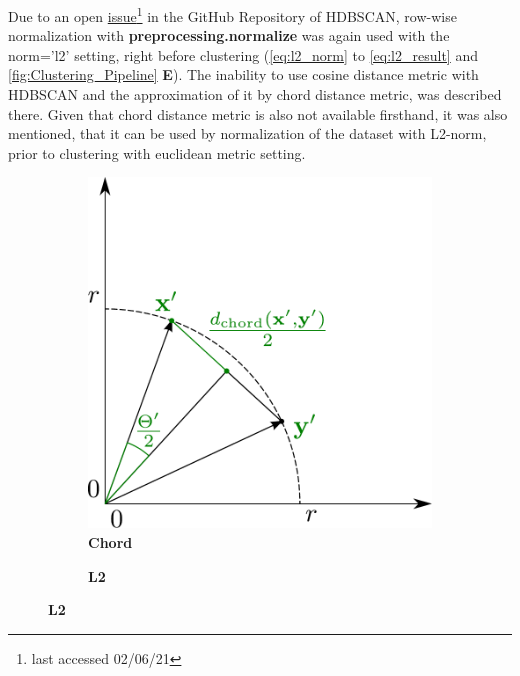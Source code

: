 Due to an open \href{https://github.com/scikit-learn-contrib/hdbscan/issues/69}{issue}\footnote{last accessed 02/06/21} in the GitHub Repository of \gls{HDBSCAN}, row-wise normalization with \textbf{preprocessing.normalize} was again used with the \colorbox{backcolour}{norm='l2'} setting, right before clustering (\autoref{eq:l2_norm} to \autoref{eq:l2_result} and \autoref{fig:Clustering_Pipeline} \textsf{\textbf{E}}). The inability to use cosine distance metric with \gls{HDBSCAN} and the approximation of it by chord distance metric, was described there. Given that chord distance metric is also not available firsthand, it was also mentioned, that it can be used by normalization of the dataset with L2-norm, prior to clustering with euclidean metric setting.

\begin{figure}[!hbt]
    \centering
    \begin{subfigure}[b]{0.475\textwidth}
        \caption[Chord]{\textbf{Chord}}
        \label{subfig:Chord}
        \includegraphics[width=\textwidth]{Graphics/Chord.pdf}
    \end{subfigure}
    \hfill
    \begin{subfigure}[b]{0.475\textwidth}
        \caption[L2]{\textbf{L2}}
        \label{subfig:L2}            

\end{subfigure}
\end{figure}

